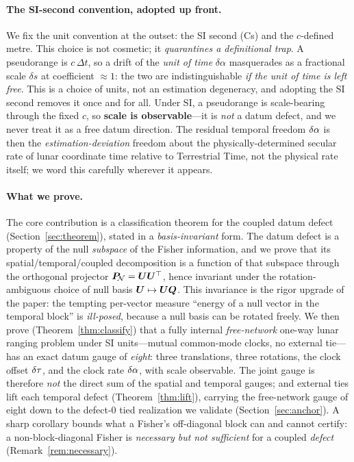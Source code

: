 \paragraph{The SI-second convention, adopted up front.}
We fix the unit convention at the outset: the SI second (Cs) and the $c$-defined metre.
This choice is not cosmetic; it \emph{quarantines a definitional trap}. A pseudorange is
$c\,\Delta t$, so a drift of the \emph{unit of time} $\delta\alpha$ masquerades as a
fractional scale $\delta s$ at coefficient $\approx1$: the two are indistinguishable
\emph{if the unit of time is left free}. This is a choice of units, not an estimation
degeneracy, and adopting the SI second removes it once and for all. Under SI, a
pseudorange is scale-bearing through the fixed $c$, so \textbf{scale is observable}---it
is \emph{not} a datum defect, and we never treat it as a free datum direction. The residual
temporal
freedom $\delta\alpha$ is then the \emph{estimation-deviation} freedom about the
physically-determined secular rate of lunar coordinate time relative to Terrestrial Time,
not the physical rate itself; we word this carefully wherever it appears.

\paragraph{What we prove.}
The core contribution is a classification theorem for the coupled datum defect
(Section~\ref{sec:theorem}), stated in a \emph{basis-invariant} form. The datum defect is
a property of the null \emph{subspace} of the Fisher information, and we prove that its
spatial/temporal/coupled decomposition is a function of that subspace through the
orthogonal projector $\bm{P}_{\!\mathcal{N}}=\bm{U}\bm{U}^\top$, hence invariant under the
rotation-ambiguous choice of null basis $\bm{U}\mapsto\bm{U}\bm Q$. This invariance is the
rigor upgrade of the paper: the tempting per-vector measure ``energy of a null vector in
the temporal block'' is \emph{ill-posed}, because a null basis can be rotated freely. We
then prove (Theorem~\ref{thm:classify}) that a fully internal \emph{free-network} one-way
lunar ranging problem under SI units---mutual common-mode clocks, no external tie---has an
exact datum gauge of \emph{eight}: three translations, three rotations, the clock offset
$\delta\tau$, and the clock rate $\delta\alpha$, with scale observable. The joint gauge is therefore
\emph{not} the direct sum of the spatial and temporal gauges; and external ties lift each
temporal defect (Theorem~\ref{thm:lift}), carrying the free-network gauge of eight down to
the defect-$0$ tied realization we validate (Section~\ref{sec:anchor}). A sharp corollary bounds what a Fisher's off-diagonal
block can and cannot certify: a non-block-diagonal Fisher is \emph{necessary but not
sufficient} for a coupled \emph{defect} (Remark~\ref{rem:necessary}).

